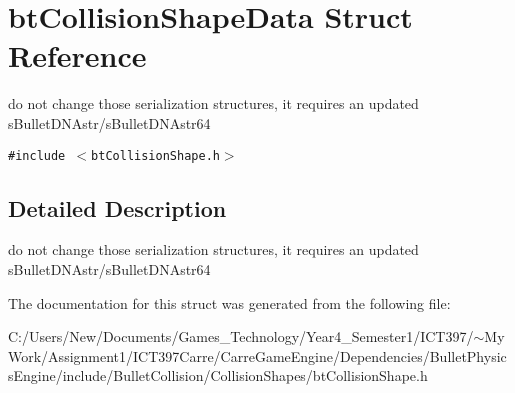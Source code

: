 \hypertarget{structbt_collision_shape_data}{
\section{btCollisionShapeData Struct Reference}
\label{structbt_collision_shape_data}
}
do not change those serialization structures, it requires an updated sBulletDNAstr/sBulletDNAstr64  


{\tt \#include $<$btCollisionShape.h$>$}



\subsection{Detailed Description}
do not change those serialization structures, it requires an updated sBulletDNAstr/sBulletDNAstr64 

The documentation for this struct was generated from the following file:\begin{CompactItemize}
\item 
C:/Users/New/Documents/Games\_\-Technology/Year4\_\-Semester1/ICT397/$\sim$My Work/Assignment1/ICT397Carre/CarreGameEngine/Dependencies/BulletPhysicsEngine/include/BulletCollision/CollisionShapes/btCollisionShape.h\end{CompactItemize}
